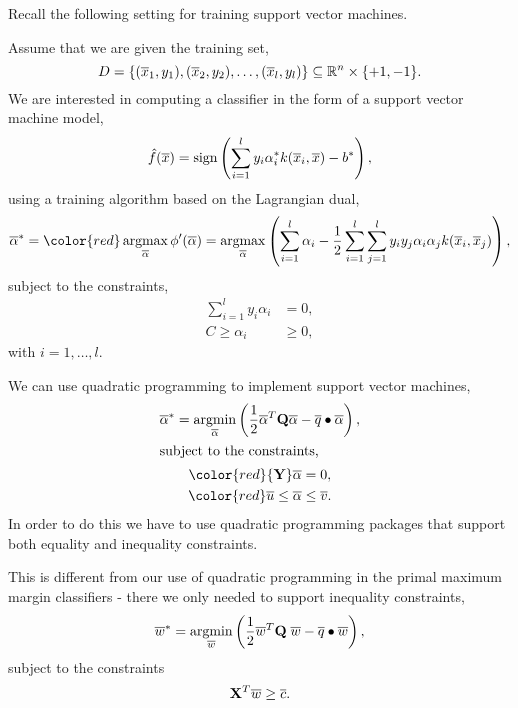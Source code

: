 \documentclass[a4paper,blends,pdf,colorBG,slideColor]{prosper}
\begin{document}
\small
Recall the following setting for training support vector machines.

Assume that we are given the training set,
\begin{equation*}
D = \{(\overline{x}_1,y_1),(\overline{x}_2,y_2),\ldots,(\overline{x}_l,y_l)\} \subseteq \mathbb{R}^{n}\times\{+1, -1\}.
\end{equation*}
We are interested in computing a classifier in the form of a support vector machine model,
\begin{equation*}
\model{f}(\ol{x}) = \sign \left ( \sum_{i=1}^l y_i \alpha^*_i k(\ol{x}_i,\ol{x}) - b^*\right ),
\end{equation*}
using a training algorithm based on the Lagrangian dual,
\begin{equation*}
\ol{\alpha}^* = {\color{red} \argmax_{\ol{\alpha}} \phi'(\ol{\alpha})} = 
 \argmax_{\ol{\alpha}}  \left (\sum_{i=1}^l \alpha_i - 
  \frac{1}{2}\sum_{i=1}^l\sum_{j=1}^l y_i y_j \alpha_i \alpha_j k(\ol{x}_i,\ol{x}_j) \right ),
\end{equation*}
subject to  the constraints,
\begin{align*}
\sum_{i=1}^l y_i \alpha_i &= 0, \\
C \ge \alpha_i &\ge 0,  
\end{align*}
with $i=1,\ldots,l$.
\es

We can use quadratic programming to implement support vector machines,
\begin{gather*}
\ol{\alpha}^* = \argmin_{\ol{\alpha}} \left (\frac{1}{2} \ol{\alpha}^T {\mathbf Q}\ol{\alpha} - \ol{q}\bullet\ol{\alpha}  \right ),\\
\intertext{subject to the constraints,}
{\color{red}{\mathbf Y} \ol{\alpha} = 0},\\
{\color{red}\ol{u} \le \ol{\alpha} \le \ol{v}}.
\end{gather*}
In order to do this we have to use quadratic programming packages
that support both equality and inequality constraints.

This is different from our use of quadratic programming in the primal 
maximum margin classifiers - there we only needed to support inequality constraints,
\begin{equation*}
\ol{w}^* =  \argmin_{\ol{w}} \left (\frac{1}{2} \ol{w}^T {\mathbf Q}\; \ol{w} - \ol{q}\bullet\ol{w}\right ),
\end{equation*}
subject to the constraints
\begin{equation*}
{\mathbf X}^T\overline{w} \ge \overline{c}.
\end{equation*}
\end{document}

